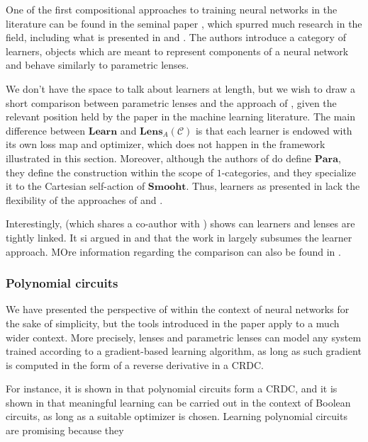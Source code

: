 \documentclass[12pt,a4paper,openright,twoside]{report}
\theoremstyle{plain}
\theoremstyle{definition}
\begin{document}
One of the first compositional approaches to training neural networks in the literature can be found in the seminal paper \cite{fong2019backprop}, which spurred much research in the field, including what is presented in \cite{gavranovic2024fundamental} and \cite{cruttwell2022categorical}. The authors introduce a category of learners, objects which are meant to represent components of a neural network and behave similarly to parametric lenses. 


We don't have the space to talk about learners at length, but we wish to draw a short comparison between parametric lenses and the approach of \cite{fong2019backprop}, given the relevant position held by the paper in the machine learning literature. The main difference between $\mathbf{Learn}$ and $\mathbf{Lens}_A(\mathcal{C})$ is that each learner is endowed with its own loss map and optimizer, which does not happen in the framework illustrated in this section. Moreover, although the authors of \cite{fong2019backprop} do define $\mathbf{Para}$, they define the construction within the scope of $1$-categories, and they specialize it to the Cartesian self-action of $\mathbf{Smooht}$. Thus, learners as presented in \cite{fong2019backprop} lack the flexibility of the approaches of \cite{gavranovic2024categorical} and \cite{cruttwell2022categorical}. 


Interestingly, \cite{fong2019lenses} (which shares a co-author with  \cite{fong2019backprop}) shows can learners and lenses are tightly linked. It si argued in \cite{shiebler2021category} and \cite{cruttwell2022categorical} that the work in \cite{cruttwell2022categorical} largely subsumes the learner approach. MOre information regarding the comparison can also be found in \cite{gavranovic2024fundamental}.

\subsubsection{Polynomial circuits}

We have presented the perspective of \cite{cruttwell2022categorical} within the context of neural networks for the sake of simplicity, but the tools introduced in the paper apply to a much wider context. More precisely, lenses and parametric lenses can model any system trained according to a gradient-based learning algorithm, as long as such gradient is computed in the form of a reverse derivative in a CRDC.  

For instance, it is shown in \cite{wilson2022categories} that polynomial circuits form a CRDC, and it is shown in \cite{wilson2021reverse} that meaningful learning can be carried out in the context of Boolean circuits, as long as a suitable optimizer is chosen. Learning polynomial circuits are promising because they 
\end{document}
